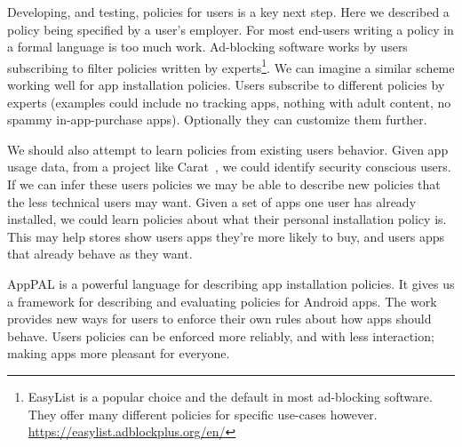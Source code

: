 \documentclass[]{llncs}
\begin{document}
Developing, and testing, policies for users is a key next step.
Here we described a policy being specified by a user's employer.
For most end-users writing a policy in a formal language is too much work.
Ad-blocking software works by users subscribing to filter policies written by experts\footnote{EasyList is a popular choice and the default in most ad-blocking software. They offer many different policies for specific use-cases however. \url{https://easylist.adblockplus.org/en/}}.
We can imagine a similar scheme working well for app installation policies.
Users subscribe to different policies by experts (examples could include no tracking apps, nothing with adult content, no spammy in-app-purchase apps).
Optionally they can customize them further.

We should also attempt to learn policies from existing users behavior.
Given app usage data, from a project like Carat~\cite{Oliner:2013ht}, we could identify security conscious users.
If we can infer these users policies we may be able to describe new policies that the less technical users may want.
Given a set of apps one user has already installed, we could learn policies about what their personal installation policy is.
This may help stores show users apps they're more likely to buy, and users apps that already behave as they want.

AppPAL is a powerful language for describing app installation policies.
It gives us a framework for describing and evaluating policies for Android apps.
The work provides new ways for users to enforce their own rules about how apps should behave.
Users policies can be enforced more reliably, and with less interaction;
  making apps more pleasant for everyone.



\end{document}
